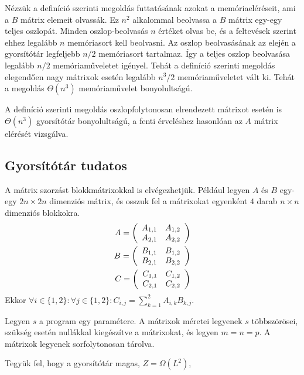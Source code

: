 \documentclass[12pt]{report}
\begin{document}
Nézzük a definíció szerinti megoldás futtatásának azokat a memóriaeléréseit,
ami a $B$ mátrix elemeit olvassák.
Ez $n^2$ alkalommal beolvassa a $B$ mátrix egy-egy teljes oszlopát.
Minden oszlop-beolvasás $n$ értéket olvas be,
és a feltevések szerint ehhez legalább $n$ memóriasort kell beolvasni.
Az oszlop beolvasásának az elején a gyorsítótár legfeljebb $n/2$ memóriasort tartalmaz.
Így a teljes oszlop beolvasása legalább $n/2$ memóriaműveletet igényel.
Tehát a definíció szerinti megoldás elegendően nagy mátrixok esetén
legalább $n^3/2$ memóriaműveletet vált ki.
Tehát a megoldás $\Theta(n^3)$ memóriaművelet bonyolultságú.\cite{prokop}

A definíció szerinti megoldás oszlopfolytonosan elrendezett mátrixot
esetén is $\Theta(n^3)$ gyorsítótár bonyolultságú,
a fenti érveléshez hasonlóan az $A$ mátrix elérését vizsgálva.

\subsection{Gyorsítótár tudatos}

A mátrix szorzást blokkmátrixokkal is elvégezhetjük.
Például legyen $A$ és $B$ egy-egy $2n \times 2n$ dimenziós mátrix,
és osszuk fel a mátrixokat egyenként $4$ darab $n \times n$ dimenziós blokkokra.
\begin{align*}
A=\left(
\begin{array}{c c}  
A_{1,1} & A_{1,2} \\
A_{2,1} & A_{2,2}
\end{array}
\right) \\
B=\left(
\begin{array}{c c}  
B_{1,1} & B_{1,2} \\
B_{2,1} & B_{2,2}
\end{array}
\right) \\
C=\left(
\begin{array}{c c}  
C_{1,1} & C_{1,2} \\
C_{2,1} & C_{2,2}
\end{array}
\right)
\end{align*}
Ekkor $\forall i \in \{1, 2\}: \forall j \in \{1, 2\}: C_{i,j} = \sum_{k=1}^2 A_{i,k} B_{k,j}$.

Legyen $s$ a program egy paramétere.
A mátrixok méretei legyenek $s$ többszörösei,
szükség esetén nullákkal kiegészítve a mátrixokat,
és legyen $m=n=p$.
A mátrixok legyenek sorfolytonosan tárolva.

Tegyük fel, hogy a gyorsítótár magas\cite{prokop}, $Z=\Omega(L^2)$,
\end{document}
